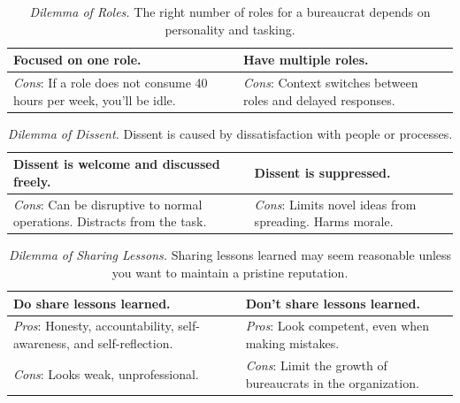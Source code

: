 \begin{center}
\begin{table}[H] %
\begin{tabular}{ | m{\dilemmatablewidth}| m{\dilemmatablewidth} | } 
  \hline
  \textbf{Focused on one role.} & 
  \textbf{Have multiple roles.} \\ 
  \hline
  \textit{Cons}: If a role does not consume 40 hours per week, you'll be idle. & 
  \textit{Cons}: Context switches between roles and delayed responses. \\  
  \hline
\end{tabular}
\caption{\textit{Dilemma of Roles.}
The right number of roles for a bureaucrat depends on personality and tasking. 
}
\label{table:number_of_roles}
\end{table}
\end{center}


\begin{center}
\begin{table}[H] %
\begin{tabular}{ | m{\dilemmatablewidth}| m{\dilemmatablewidth} | } 
  \hline
  \textbf{Dissent is welcome and discussed freely.} & 
  \textbf{Dissent is suppressed.} \\ 
  \hline
  \textit{Cons}: Can be disruptive to normal operations. Distracts from the task. & 
  \textit{Cons}: Limits novel ideas from spreading. Harms morale. \\  
  \hline
\end{tabular}
\caption{\textit{Dilemma of Dissent.}
Dissent is caused by dissatisfaction with people or processes. 
}
\label{table:how_dissent_is_responded_to}
\end{table}
\end{center}


\begin{center}
\begin{table}[H] %
\begin{tabular}{ | m{\dilemmatablewidth}| m{\dilemmatablewidth} | } 
  \hline
  \textbf{Do share lessons learned.} & 
  \textbf{Don't share lessons learned.} \\ 
  \hline
  \textit{Pros}: Honesty, accountability, self-awareness, and self-reflection. & 
  \textit{Pros}: Look competent, even when making mistakes. \\  
  \hline
  \textit{Cons}: Looks weak, unprofessional. & 
  \textit{Cons}: Limit the growth of bureaucrats in the organization. \\  
  \hline
\end{tabular}
\caption{\textit{Dilemma of Sharing Lessons.}
Sharing lessons learned may seem reasonable unless you want to maintain a pristine reputation. 
}
\label{table:sharing_lessons_learned}
\end{table}
\end{center}

